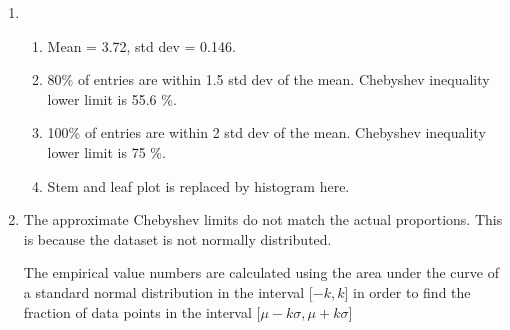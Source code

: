 \begin{enumerate}
	\begin{figure}[H]
		\centering
	\end{figure} 
	
	\item \begin{enumerate}
		\item Mean = 3.72, std dev = 0.146.
		
		
		\item 80\% of entries are within 1.5 std dev of the mean. Chebyshev inequality lower limit is 55.6 \%.
		\item 100\% of entries are within 2 std dev of the mean. Chebyshev inequality lower limit is 75 \%.
		\item Stem and leaf plot is replaced by histogram here.
		
		\begin{figure}[H]
			\centering
		\end{figure} 
		
		
	\end{enumerate}
	
	\item The approximate Chebyshev limits do not match the actual proportions. This is because the dataset is not normally distributed.
	
	The empirical value numbers are calculated using the area under the curve of a standard normal distribution in the interval [$ -k, k $] in order to find the fraction of data points in the interval [$ \mu - k \sigma, \mu + k \sigma $] \\
	

\end{enumerate}
